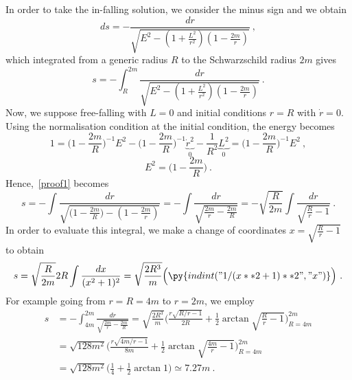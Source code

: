    In order to take the in-falling solution, we consider the minus sign and we obtain 
    \begin{equation*}
        ds = - \frac{dr}{\sqrt{E^2 - (1 + \frac{L^2}{r^2}) (1 - \frac{2m}{r}  )}} ~,
    \end{equation*}
    which integrated from a generic radius $R$ to the Schwarzschild radius $2m$ gives
    \begin{equation}\label{proof1}
        s = - \int_R^{2m} \frac{dr}{\sqrt{E^2 - (1 + \frac{L^2}{r^2}) (1 - \frac{2m}{r}  )}} ~.
    \end{equation}
    Now, we suppose free-falling with $L = 0$ and initial conditions $r=R$ with $\dot r = 0$. Using the normalisation condition at the initial condition, the energy becomes 
    \begin{equation*}
        1 = \Big(1 - \frac{2m}{R} \Big )^{-1} E^2 - \Big(1 - \frac{2m}{R} \Big )^{-1} \underbrace{\dot r^2}_0 - \frac{1}{R^2} \underbrace{L^2}_0 = \Big(1 - \frac{2m}{R} \Big )^{-1} E^2 ~,
    \end{equation*}
    \begin{equation*}
        E^2 = \Big(1 - \frac{2m}{R} \Big ) ~.
    \end{equation*}
    Hence,~\eqref{proof1} becomes 
    \begin{equation*}
        s = - \int \frac{dr}{\sqrt{(1 - \frac{2m}{R} \Big )- (1 - \frac{2m}{r} )}} = - \int \frac{dr}{\sqrt{ \frac{2m}{r} - \frac{2m}{R}}} = - \sqrt{\frac{R}{2m}} \int \frac{dr}{\sqrt{ \frac{R}{r} - 1}} ~.
    \end{equation*}
    In order to evaluate this integral, we make a change of coordinates $x = \sqrt{\frac{R}{r} - 1}$ to obtain 
    \begin{equation*}
        s = \sqrt{\frac{R}{2m}} 2 R \int \frac{dx}{(x^2 + 1)^2} = \sqrt{\frac{2R^3}{m}} \Big ( \py{indint("1 / (x**2 + 1)**2", "x")} \Big) ~.
    \end{equation*}
    For example going from $r = R = 4m$ to $r = 2m$, we employ
    \begin{equation*}
    \begin{aligned}
        s & = - \int_{4m}^{2m} \frac{dr}{\sqrt{ \frac{2m}{r} - \frac{2m}{R}}} = \sqrt{\frac{2R^3}{m}} \Big ( \frac{r \sqrt{R / r - 1}}{2 R} + \frac{1}{2} \arctan \sqrt{\frac{R}{r} - 1} \Big)_{R = 4m}^{2m} \\ & = \sqrt{128 m^2} \Big ( \frac{r \sqrt{4m / r - 1}}{8 m} + \frac{1}{2} \arctan \sqrt{\frac{4m}{r} - 1} \Big)_{R = 4m}^{2m}  \\ & = \sqrt{128 m^2} \Big ( \frac{1}{4} + \frac{1}{2} \arctan 1 \Big) \simeq 7.27 m ~.
    \end{aligned}
    \end{equation*}    

